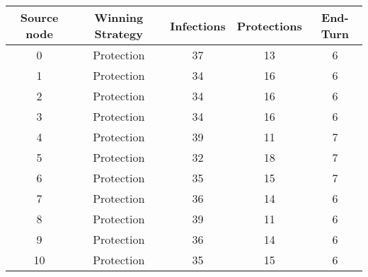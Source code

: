\documentclass[results.tex]{subfiles}
\begin{document}
    \begin{center}
        \begin{tabular}{| c || c | c | c | c |}
            \hline
            {\bfseries Source node} & {\bfseries Winning Strategy} & {\bfseries Infections} & {\bfseries Protections}
            & {\bfseries End-Turn}
            \\  %
            \hline\hline
            0                       & Protection                   & 37                     & 13                      & 6                    \\
            \hline
            1                       & Protection                   & 34                     & 16                      & 6                    \\
            \hline
            2                       & Protection                   & 34                     & 16                      & 6                    \\
            \hline
            3                       & Protection                   & 34                     & 16                      & 6                    \\
            \hline
            4                       & Protection                   & 39                     & 11                      & 7                    \\
            \hline
            5                       & Protection                   & 32                     & 18                      & 7                    \\
            \hline
            6                       & Protection                   & 35                     & 15                      & 7                    \\
            \hline
            7                       & Protection                   & 36                     & 14                      & 6                    \\
            \hline
            8                       & Protection                   & 39                     & 11                      & 6                    \\
            \hline
            9                       & Protection                   & 36                     & 14                      & 6                    \\
            \hline
            10                      & Protection                   & 35                     & 15                      & 6                    \\

\end{tabular}
\end{center}
\end{document}
